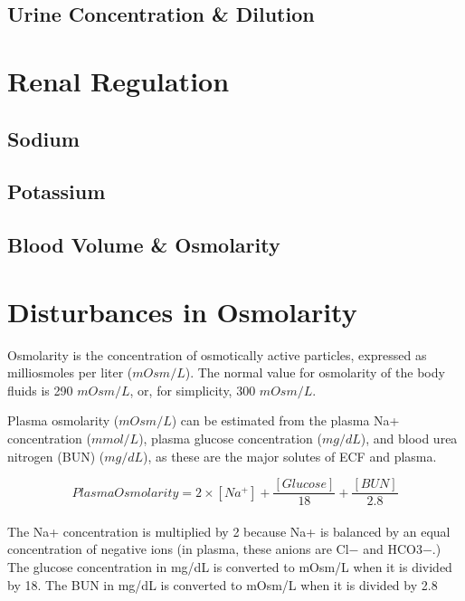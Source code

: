 \subsection{Urine Concentration \& Dilution}


\section{Renal Regulation}

\subsection{Sodium}

\subsection{Potassium}

\subsection{Blood Volume \& Osmolarity}


\section{Disturbances in Osmolarity}

Osmolarity is the concentration of osmotically active particles, expressed as milliosmoles per liter ($mOsm/L$). The normal value for osmolarity of the body fluids is 290 $mOsm/L$, or, for simplicity, 300 $mOsm/L$.

Plasma osmolarity ($mOsm/L$) can be estimated from the plasma Na+ concentration ($mmol/L$), plasma glucose concentration ($mg/dL$), and blood urea nitrogen (BUN) ($mg/dL$), as these are the major solutes of ECF and plasma. 

\begin{equation}
Plasma Osmolarity = 2 \times [Na^+] + \frac{[Glucose]}{18} +\frac{[BUN]}{2.8}
\label{osmolarity}
\end{equation}
\paragraph{}
The Na+ concentration is multiplied by 2 because Na+ is balanced by an equal concentration of negative ions (in plasma, these anions are Cl− and HCO3−.) The glucose concentration in mg/dL is converted to mOsm/L when it is divided by 18. The BUN in mg/dL is converted to mOsm/L when it is divided by 2.8

